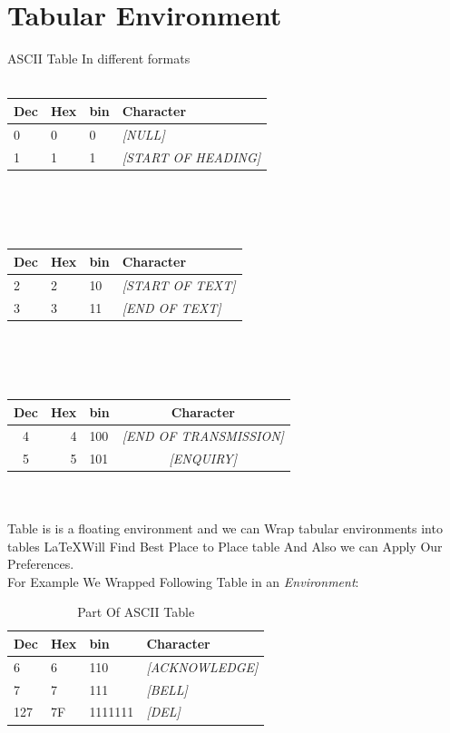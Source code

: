 \documentclass{article}
\begin{document}
	\section{Tabular Environment}
 		ASCII Table In different formats \\\\ %
		\begin{tabular}{lll|l}%
			Dec & Hex & bin & Character\\
			\hline
			0 & 0 & 0 & \emph{[NULL]}\\
			1 & 1 & 1 & \emph{[START OF HEADING]}\\
		\end{tabular}
		\\ \\ \\
		\begin{tabular}{|lll|l|}
			\hline
			Dec & Hex & bin & Character\\
			\hline
			2 & 2 & 10 & \emph{[START OF TEXT]}\\
			3 & 3 & 11 & \emph{[END OF TEXT]}\\
			\hline
		\end{tabular}
		\\ \\ \\
		\begin{tabular}{|crl||c|} %
			\hline
			Dec & Hex & bin & Character\\
			\hline \hline
			4 & 4 & 100 & \emph{[END OF TRANSMISSION]}\\
			5 & 5 & 101 & \emph{[ENQUIRY]}\\
			\hline
		\end{tabular}
	\\ \\
		Table is is a floating environment and we can Wrap tabular environments into tables \LaTeX Will Find Best Place to Place table And Also we can Apply Our Preferences.
		\\For Example We Wrapped Following Table in an \emph{Environment}:\\
		\begin{table}[htbp]%
			\begin{center}
				\begin{tabular}{|lll|l|}
					\hline
					Dec & Hex & bin & Character\\
					\hline
					6 & 6 & 110 & \emph{[ACKNOWLEDGE]}\\
					\vspace{1cm}
					7 & 7 & 111 & \emph{[BELL]}\\
					127 & 7F & 1111111 & \emph{[DEL]}\\
					\hline
				\end{tabular}
			\end{center}
			\caption{Part Of ASCII Table}
			\label{tab:ASCII} %
		\end{table}
\end{document}
